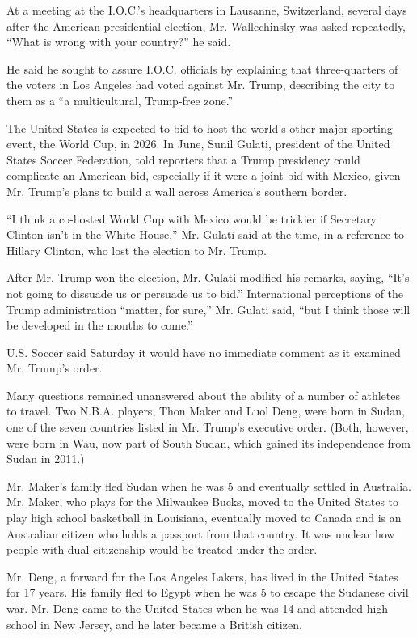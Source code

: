At a meeting at the I.O.C.'s headquarters in Lausanne, Switzerland,
several days after the American presidential election, Mr. Wallechinsky
was asked repeatedly, ``What is wrong with your country?'' he said.

He said he sought to assure I.O.C. officials by explaining that
three-quarters of the voters in Los Angeles had voted against Mr. Trump,
describing the city to them as a ``a multicultural, Trump-free zone.''

The United States is expected to bid to host the world's other major
sporting event, the World Cup, in 2026. In June, Sunil Gulati, president
of the United States Soccer Federation, told reporters that a Trump
presidency could complicate an American bid, especially if it were a
joint bid with Mexico, given Mr. Trump's plans to build a wall across
America's southern border.

``I think a co-hosted World Cup with Mexico would be trickier if
Secretary Clinton isn't in the White House,'' Mr. Gulati said at the
time, in a reference to Hillary Clinton, who lost the election to Mr.
Trump.

After Mr. Trump won the election, Mr. Gulati modified his remarks,
saying, ``It's not going to dissuade us or persuade us to bid.''
International perceptions of the Trump administration ``matter, for
sure,'' Mr. Gulati said, ``but I think those will be developed in the
months to come.''

U.S. Soccer said Saturday it would have no immediate comment as it
examined Mr. Trump's order.

Many questions remained unanswered about the ability of a number of
athletes to travel. Two N.B.A. players, Thon Maker and Luol Deng, were
born in Sudan, one of the seven countries listed in Mr. Trump's
executive order. (Both, however, were born in Wau, now part of South
Sudan, which gained its independence from Sudan in 2011.)

Mr. Maker's family fled Sudan when he was 5 and eventually settled in
Australia. Mr. Maker, who plays for the Milwaukee Bucks, moved to the
United States to play high school basketball in Louisiana, eventually
moved to Canada and is an Australian citizen who holds a passport from
that country. It was unclear how people with dual citizenship would be
treated under the order.

Mr. Deng, a forward for the Los Angeles Lakers, has lived in the United
States for 17 years. His family fled to Egypt when he was 5 to escape
the Sudanese civil war. Mr. Deng came to the United States when he was
14 and attended high school in New Jersey, and he later became a British
citizen.

